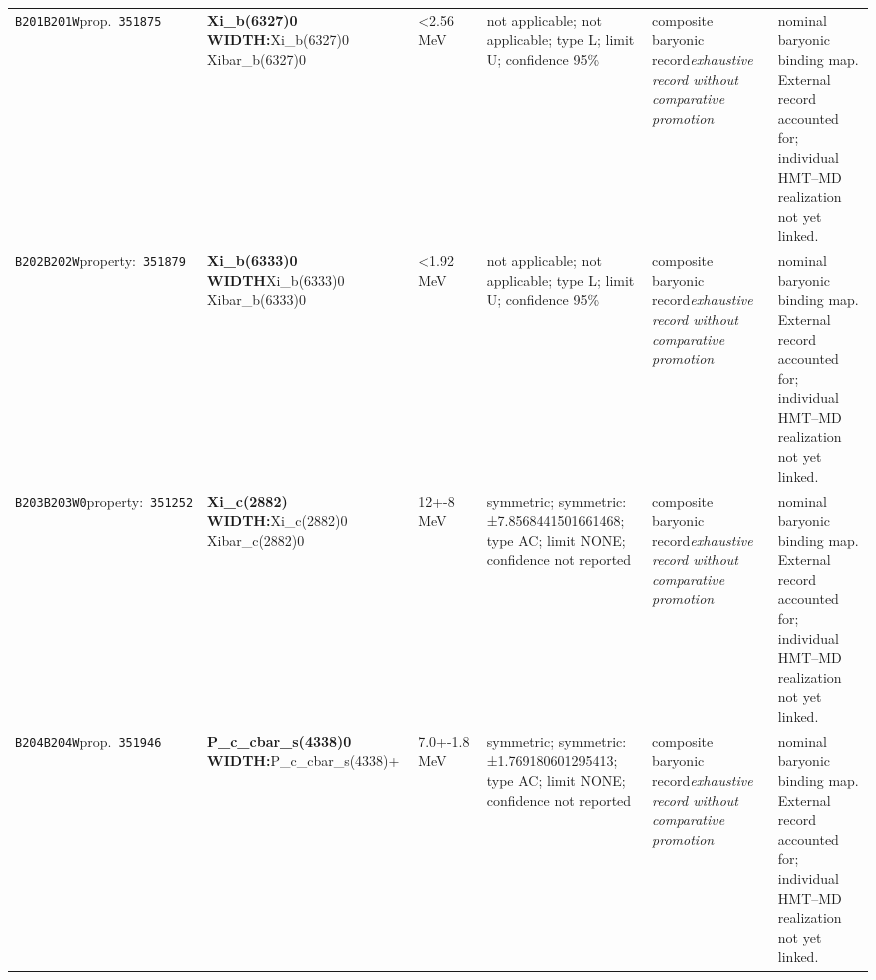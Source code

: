 \begin{landscape}
\begin{longtable}{L{1.85cm}L{4.45cm}L{2.35cm}L{4.05cm}L{3.35cm}L{7.15cm}}
\texttt{B201}\newline \texttt{B201W}\newline prop.\ \texttt{351875} & \textbf{Xi\_\allowbreak{}b(6327)0 WIDTH:}\newline Xi\_\allowbreak{}b(6327)0 \textbar{}\allowbreak{} Xibar\_\allowbreak{}b(6327)0 & \textless{}2.56\,MeV & not applicable; not applicable; type L; limit U; confidence 95\% & composite baryonic record\newline \emph{exhaustive record without comparative promotion} & nominal baryonic binding map. External record accounted for; individual HMT--MD realization not yet linked. \\
\texttt{B202}\newline \texttt{B202W}\newline property:\ \texttt{351879} & \textbf{Xi\_\allowbreak{}b(6333)0 WIDTH}\newline Xi\_\allowbreak{}b(6333)0 \textbar{}\allowbreak{} Xibar\_\allowbreak{}b(6333)0 & \textless{}1.92\,MeV & not applicable; not applicable; type L; limit U; confidence 95\% & composite baryonic record\newline \emph{exhaustive record without comparative promotion} & nominal baryonic binding map. External record accounted for; individual HMT--MD realization not yet linked. \\
\texttt{B203}\newline \texttt{B203W0}\newline property:\ \texttt{351252} & \textbf{Xi\_\allowbreak{}c(2882) WIDTH:}\newline Xi\_\allowbreak{}c(2882)0 \textbar{}\allowbreak{} Xibar\_\allowbreak{}c(2882)0 & 12+-8\,MeV & symmetric; symmetric: ±7.8568441501661468; type AC; limit NONE; confidence not reported & composite baryonic record\newline \emph{exhaustive record without comparative promotion} & nominal baryonic binding map. External record accounted for; individual HMT--MD realization not yet linked. \\
\texttt{B204}\newline \texttt{B204W}\newline prop.\ \texttt{351946} & \textbf{P\_\allowbreak{}c\_\allowbreak{}cbar\_\allowbreak{}s(4338)0 WIDTH:}\newline P\_\allowbreak{}c\_\allowbreak{}cbar\_\allowbreak{}s(4338)+ & 7.0+-1.8\,MeV & symmetric; symmetric: ±1.769180601295413; type AC; limit NONE; confidence not reported & composite baryonic record\newline \emph{exhaustive record without comparative promotion} & nominal baryonic binding map. External record accounted for; individual HMT--MD realization not yet linked. \\

\end{longtable}
\end{landscape}
